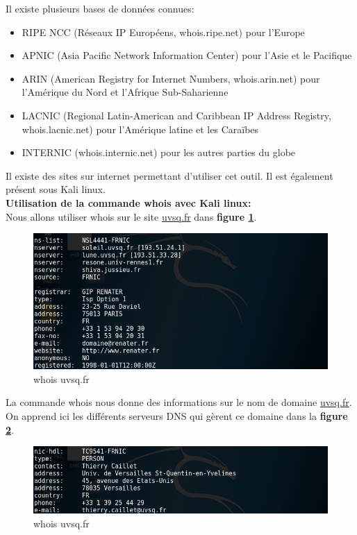  Il existe plusieurs bases de données connues:

\begin{itemize}
    \item RIPE NCC (Réseaux IP Européens, whois.ripe.net) pour l'Europe
    \item APNIC (Asia Pacific Network Information Center) pour l'Asie et le Pacifique
    \item ARIN (American Registry for Internet Numbers, whois.arin.net) pour l'Amérique du Nord et l'Afrique Sub-Saharienne
    \item LACNIC (Regional Latin-American and Caribbean IP Address Registry, whois.lacnic.net) pour l'Amérique latine et les Caraïbes
    \item  INTERNIC (whois.internic.net) pour les autres parties du globe
\end{itemize}

 Il existe des sites sur internet permettant d'utiliser cet outil. Il est également présent sous Kali linux.\\

 \textbf{Utilisation de la commande whois avec Kali linux:}\\
Nous allons utiliser whois sur le site \url{uvsq.fr} dans \textbf{figure \ref{fig:whois}}.\\

\begin{figure}[htp!]
  \centering
  \setlength\figureheight{7cm}
  \setlength\figurewidth{9cm}
  \includegraphics[width=1\textwidth]{oui/images/Whois/whois2.PNG}
  \caption{whois uvsq.fr}
  \label{fig:whois}
\end{figure}

 La commande whois nous donne des informations sur le nom de domaine \url{uvsq.fr}. On apprend ici les différents serveurs DNS qui gèrent ce domaine dans la  \textbf{figure \ref{fig:whoisdns}}.

\begin{figure}[htp!]
  \centering
  \setlength\figureheight{7cm}
  \setlength\figurewidth{9cm}
  \includegraphics[width=1\textwidth]{oui/images/Whois/whois3.PNG}
  \caption{whois uvsq.fr}
  \label{fig:whoisdns}
\end{figure}


